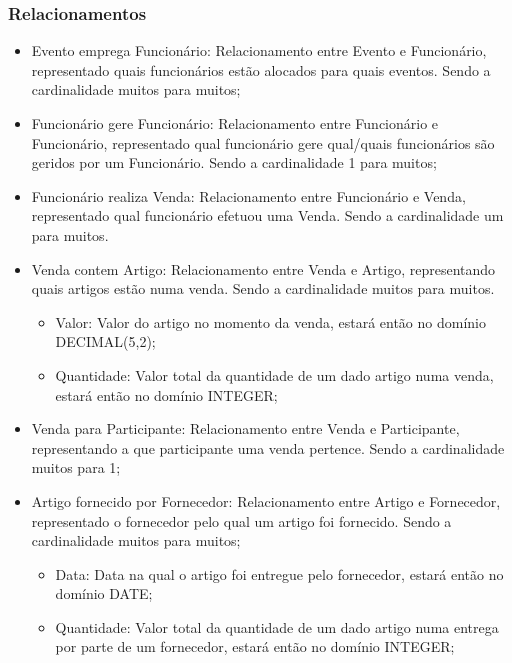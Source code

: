 \documentclass[a4paper,12pt]{scrreprt}
\begin{document}
             \subsubsection{Relacionamentos}
             \begin{itemize}
                 \item{Evento emprega Funcionário:} Relacionamento entre Evento e Funcionário, representado quais funcionários estão alocados para quais eventos. Sendo a cardinalidade muitos para muitos;
                 \item{Funcionário gere Funcionário:} Relacionamento entre Funcionário e Funcionário, representado qual funcionário gere qual/quais funcionários são geridos por um Funcionário. Sendo a cardinalidade 1 para muitos;
                 \item{Funcionário realiza Venda:} Relacionamento entre Funcionário e Venda, representado qual funcionário efetuou uma Venda. Sendo a cardinalidade um para muitos.
                 \item{Venda contem Artigo:} Relacionamento entre Venda e Artigo, representando quais artigos estão numa venda. Sendo a cardinalidade muitos para muitos.
                     \begin{itemize}
                     \item{Valor:} Valor do artigo no momento da venda, estará então no domínio DECIMAL(5,2);
                       
                     \item{Quantidade:} Valor total da quantidade de um dado artigo numa venda, estará então no domínio INTEGER;
                       
                     \end{itemize}
                 \item{Venda para Participante:} Relacionamento entre Venda e Participante, representando a que participante uma venda pertence. Sendo a cardinalidade muitos para 1;
                 \item{Artigo fornecido por Fornecedor:} Relacionamento entre Artigo e Fornecedor, representado o fornecedor pelo qual um artigo foi fornecido. Sendo a cardinalidade muitos para muitos;
                     \begin{itemize}
                     \item{Data:} Data na qual o artigo foi entregue pelo fornecedor, estará então no domínio DATE;
                       
                     \item{Quantidade:} Valor total da quantidade de um dado artigo numa entrega por parte de um fornecedor, estará então no domínio INTEGER;
                       

\end{itemize}
\end{itemize}
\end{document}
